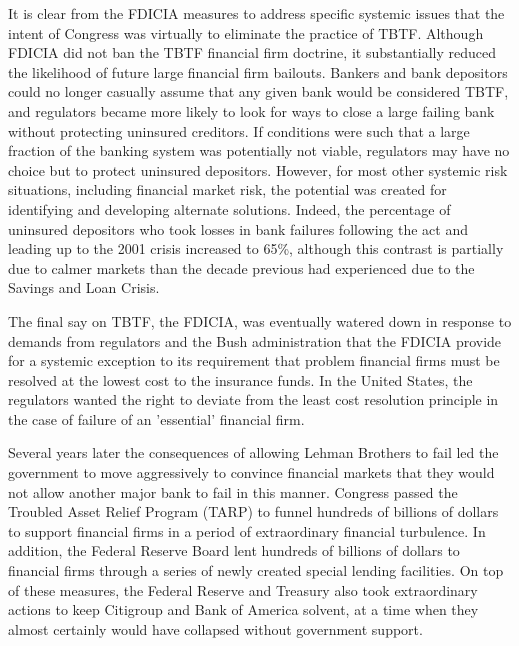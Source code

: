 It is clear from the FDICIA measures to address specific systemic issues that the intent of Congress was virtually to eliminate the practice of TBTF. Although FDICIA did not ban the TBTF financial firm doctrine, it substantially reduced the likelihood of future large financial firm bailouts. Bankers and bank depositors could no longer casually assume that any given bank would be considered TBTF, and regulators became more likely to look for ways to close a large failing bank without protecting uninsured creditors. If conditions were such that a large fraction of the banking system was potentially not viable, regulators may have no choice but to protect uninsured depositors. However, for most other systemic risk situations, including financial market risk, the potential was created for identifying and developing alternate solutions.\cite{Wall} Indeed, the percentage of uninsured depositors who took losses in bank failures following the act and leading up to the 2001 crisis increased to 65\%, although this contrast is partially due to calmer markets than the decade previous had experienced due to the Savings and Loan Crisis.\cite{Peterson}\cite{Wall}

The final say on TBTF, the FDICIA, was eventually watered down in response to demands from regulators and the Bush administration that the FDICIA provide for a systemic exception to its requirement that problem financial firms must be resolved at the lowest cost to the insurance funds.  In the United States, the regulators wanted the right to deviate from the least cost resolution principle in the case of failure of an 'essential' financial firm.\cite{Kaufman}\cite{Rime}

Several years later the consequences of allowing Lehman Brothers to fail led the government to move aggressively to convince financial markets that they would not allow another major bank to fail in this manner. Congress passed the Troubled Asset Relief Program (TARP) to funnel hundreds of billions of dollars to support financial firms in a period of extraordinary financial turbulence. In addition, the Federal Reserve Board lent hundreds of billions of dollars to financial firms through a series of newly created special lending facilities. On top of these measures, the Federal Reserve and Treasury also took extraordinary actions to keep Citigroup and Bank of America solvent, at a time when they almost certainly would have collapsed without government support.\cite{Baker}

